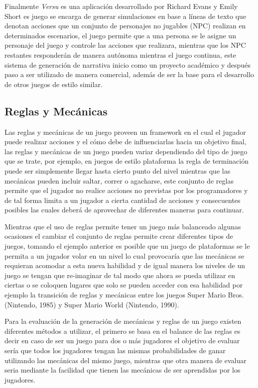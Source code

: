 Finalmente \textit{Versu} es una aplicación desarrollado por Richard Evans y
Emily Short \cite{evans2013versu} es juego se encarga de generar simulaciones en
base a líneas de texto que denotan acciones que un conjunto de personajes no
jugables (NPC) realizan en determinados escenarios, el juego permite que a una
persona se le asigne un personaje del juego y controle las acciones que
realizara, mientras que los NPC restantes responderán de manera autónoma
mientras el juego continua, este sistema de generación de narrativa inicio como
un proyecto académico y después paso a ser utilizado de manera comercial, además
de ser la base para el desarrollo de otros juegos de estilo similar.

\subsection{Reglas y Mecánicas}
\label{subsection:rulesandmechanics}

Las reglas y mecánicas de un juego proveen un framework en el cual el
jugador puede realizar acciones y el cómo debe de influenciarlas hacia un
objetivo final, las reglas y mecánicas de un juego pueden variar dependiendo del
tipo de juego que se trate, por ejemplo, en juegos de estilo plataforma la regla
de terminación puede ser simplemente llegar hasta cierto punto del nivel
mientras que las mecánicas pueden incluir saltar, correr o agacharse, este
conjunto de reglas permite que el jugador no realice acciones no previstas por
los programadores y de tal forma limita a un jugador a cierta cantidad de
acciones y consecuentes posibles las cuales deberá de aprovechar de diferentes
maneras para continuar.

Mientras que el uso de reglas permite tener un juego más balanceado algunas
ocasiones el cambiar el conjunto de reglas permite crear diferentes tipos de
juegos, tomando el ejemplo anterior es posible que un juego de plataformas se le
permita a un jugador volar en un nivel lo cual provocaría que las mecánicas se
requieran acomodar a esta nueva habilidad y de igual manera los niveles de un
juego se tengan que re-imaginar de tal modo que ahora se pueda utilizar en
ciertas o se coloquen lugares que solo se pueden acceder con esa habilidad por
ejemplo la transición de reglas y mecánicas entre los juegos Super Mario Bros.
(Nintendo, 1985) \cite{DeMaria2004} \cite{MarioBrosInstruction} y Super Mario
World (Nintendo, 1990). \cite{SuperMario} \cite{SuperMarioInstruction}

Para la evaluación de la generación de mecánicas y reglas de un juego existen
diferentes métodos a utilizar, el primero se basa en el balance de las reglas es
decir en caso de ser un juego para dos o más jugadores el objetivo de evaluar
sería que todos los jugadores tengan las mismas probabilidades de ganar
utilizando las mecánicas del mismo juego, mientras que otra manera de evaluar
seria mediante la facilidad que tienen las mecánicas de ser aprendidas por los
jugadores.

